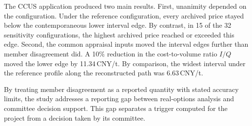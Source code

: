 The CCUS application produced two main results. First, unanimity depended on the configuration. Under the reference configuration, every archived price stayed below the contemporaneous lower interval edge. By contrast, in 15 of the 32 sensitivity configurations, the highest archived price reached or exceeded this edge. Second, the common appraisal inputs moved the interval edges further than member disagreement did. A 10\% reduction in the cost-to-volume ratio $I/Q$ moved the lower edge by 11.34\,CNY/t. By comparison, the widest interval under the reference profile along the reconstructed path was 6.63\,CNY/t.

By treating member disagreement as a reported quantity with stated accuracy limits, the study addresses a reporting gap between real-options analysis and committee decision support. This gap separates a trigger computed for the project from a decision taken by its committee.
